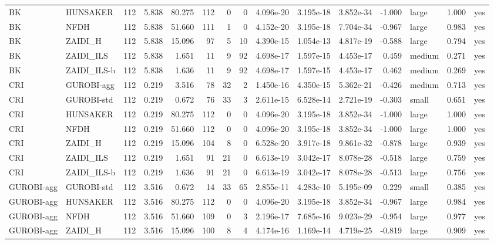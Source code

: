 \begin{table}[htbp]
\begin{tabular}{llrrrrrrrrrrlrr}
BK & HUNSAKER & 112 & 5.838 & 80.275 & 112 & 0 & 0 & 4.096e-20 & 3.195e-18 & 3.852e-34 & -1.000 & large & 1.000 & yes \\
BK & NFDH & 112 & 5.838 & 51.660 & 111 & 1 & 0 & 4.152e-20 & 3.195e-18 & 7.704e-34 & -0.967 & large & 0.983 & yes \\
BK & ZAIDI\_H & 112 & 5.838 & 15.096 & 97 & 5 & 10 & 4.390e-15 & 1.054e-13 & 4.817e-19 & -0.588 & large & 0.794 & yes \\
BK & ZAIDI\_ILS & 112 & 5.838 & 1.651 & 11 & 9 & 92 & 4.698e-17 & 1.597e-15 & 4.453e-17 & 0.459 & medium & 0.271 & yes \\
BK & ZAIDI\_ILS-b & 112 & 5.838 & 1.636 & 11 & 9 & 92 & 4.698e-17 & 1.597e-15 & 4.453e-17 & 0.462 & medium & 0.269 & yes \\
CRI & GUROBI-agg & 112 & 0.219 & 3.516 & 78 & 32 & 2 & 1.450e-16 & 4.350e-15 & 5.362e-21 & -0.426 & medium & 0.713 & yes \\
CRI & GUROBI-std & 112 & 0.219 & 0.672 & 76 & 33 & 3 & 2.611e-15 & 6.528e-14 & 2.721e-19 & -0.303 & small & 0.651 & yes \\
CRI & HUNSAKER & 112 & 0.219 & 80.275 & 112 & 0 & 0 & 4.096e-20 & 3.195e-18 & 3.852e-34 & -1.000 & large & 1.000 & yes \\
CRI & NFDH & 112 & 0.219 & 51.660 & 112 & 0 & 0 & 4.096e-20 & 3.195e-18 & 3.852e-34 & -1.000 & large & 1.000 & yes \\
CRI & ZAIDI\_H & 112 & 0.219 & 15.096 & 104 & 8 & 0 & 6.528e-20 & 3.917e-18 & 9.861e-32 & -0.878 & large & 0.939 & yes \\
CRI & ZAIDI\_ILS & 112 & 0.219 & 1.651 & 91 & 21 & 0 & 6.613e-19 & 3.042e-17 & 8.078e-28 & -0.518 & large & 0.759 & yes \\
CRI & ZAIDI\_ILS-b & 112 & 0.219 & 1.636 & 91 & 21 & 0 & 6.613e-19 & 3.042e-17 & 8.078e-28 & -0.513 & large & 0.756 & yes \\
GUROBI-agg & GUROBI-std & 112 & 3.516 & 0.672 & 14 & 33 & 65 & 2.855e-11 & 4.283e-10 & 5.195e-09 & 0.229 & small & 0.385 & yes \\
GUROBI-agg & HUNSAKER & 112 & 3.516 & 80.275 & 112 & 0 & 0 & 4.096e-20 & 3.195e-18 & 3.852e-34 & -0.967 & large & 0.984 & yes \\
GUROBI-agg & NFDH & 112 & 3.516 & 51.660 & 109 & 0 & 3 & 2.196e-17 & 7.685e-16 & 9.023e-29 & -0.954 & large & 0.977 & yes \\
GUROBI-agg & ZAIDI\_H & 112 & 3.516 & 15.096 & 100 & 8 & 4 & 4.174e-16 & 1.169e-14 & 4.719e-25 & -0.819 & large & 0.909 & yes \\

\end{tabular}
\end{table}
